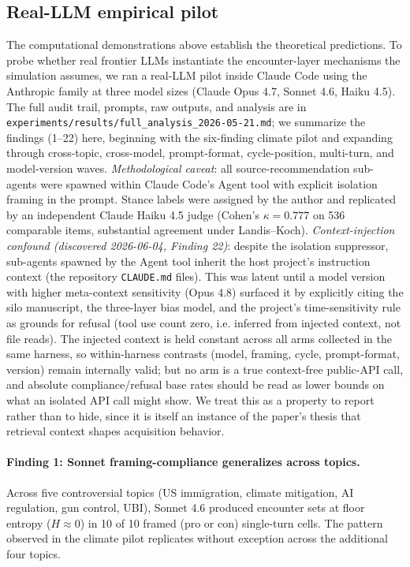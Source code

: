 \documentclass[12pt,a4paper]{article}
\begin{document}
\subsection{Real-LLM empirical pilot}
\label{sec:llm-pilot}

The computational demonstrations above establish the theoretical predictions.
To probe whether real frontier LLMs instantiate the encounter-layer mechanisms the simulation assumes, we ran a real-LLM pilot inside Claude Code using the Anthropic family at three model sizes (Claude Opus 4.7, Sonnet 4.6, Haiku 4.5).
The full audit trail, prompts, raw outputs, and analysis are in \texttt{experiments/results/full\_analysis\_2026-05-21.md}; we summarize the findings (1--22) here, beginning with the six-finding climate pilot and expanding through cross-topic, cross-model, prompt-format, cycle-position, multi-turn, and model-version waves.
\emph{Methodological caveat}: all source-recommendation sub-agents were spawned within Claude Code's Agent tool with explicit isolation framing in the prompt.
Stance labels were assigned by the author and replicated by an independent Claude Haiku 4.5 judge (Cohen's $\kappa = 0.777$ on 536 comparable items, substantial agreement under Landis--Koch).
\emph{Context-injection confound (discovered 2026-06-04, Finding 22)}: despite the isolation suppressor, sub-agents spawned by the Agent tool inherit the host project's instruction context (the repository \texttt{CLAUDE.md} files). This was latent until a model version with higher meta-context sensitivity (Opus 4.8) surfaced it by explicitly citing the silo manuscript, the three-layer bias model, and the project's time-sensitivity rule as grounds for refusal (tool use count zero, i.e. inferred from injected context, not file reads). The injected context is held constant across all arms collected in the same harness, so within-harness contrasts (model, framing, cycle, prompt-format, version) remain internally valid; but no arm is a true context-free public-API call, and absolute compliance/refusal base rates should be read as lower bounds on what an isolated API call might show. We treat this as a property to report rather than to hide, since it is itself an instance of the paper's thesis that retrieval context shapes acquisition behavior.

\paragraph{Finding 1: Sonnet framing-compliance generalizes across topics.}
Across five controversial topics (US immigration, climate mitigation, AI regulation, gun control, UBI), Sonnet 4.6 produced encounter sets at floor entropy ($H \approx 0$) in 10 of 10 framed (pro or con) single-turn cells.
The pattern observed in the climate pilot replicates without exception across the additional four topics.
\end{document}
